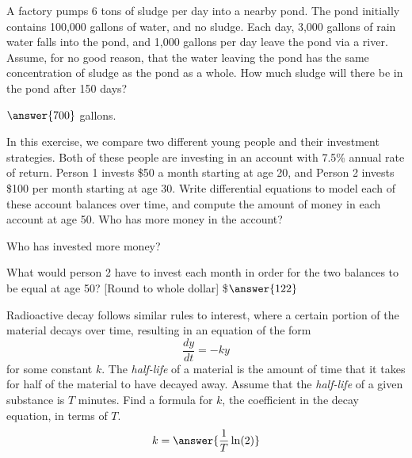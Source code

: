 \documentclass{ximera}
\begin{document}
\begin{exercise}
    A factory pumps 6 tons of sludge per day into a nearby pond. The pond initially contains 100,000 gallons of water, and no sludge. Each day, 3,000 gallons of rain water falls into the pond, and 1,000 gallons per day leave the pond via a river. Assume, for no good reason, that the water leaving the pond has the same concentration of sludge as the pond as a whole. How much sludge will there be in the pond after 150 days? %
    
    $\answer{700}$ gallons.
\end{exercise}

\begin{exercise}
    In this exercise, we compare two different young people and their investment strategies. Both of these people are investing in an account with 7.5\% annual rate of return. Person 1 invests \$50 a month starting at age 20, and Person 2 invests \$100 per month starting at age 30. Write differential equations to model each of these account balances over time, and compute the amount of money in each account at age 50. Who has more money in the account? 
    \begin{multipleChoice}
    \end{multipleChoice}
    \begin{problem}
        Who has invested more money? 
        \begin{multipleChoice}
        \end{multipleChoice}
        \begin{problem}
            What would person 2 have to invest each month in order for the two balances to be equal at age 50? [Round to whole dollar] \$$\answer{122}$
        \end{problem}
    \end{problem}
\end{exercise}

\begin{exercise}
    Radioactive decay follows similar rules to interest, where a certain portion of the material decays over time, resulting in an equation of the form 
    \[ 
        \frac{dy}{dt} = -ky 
    \] 
    for some constant $k$. The \emph{half-life} of a material is the amount of time that it takes for half of the material to have decayed away. Assume that the \emph{half-life} of a given substance is $T$ minutes. Find a formula for $k$, the coefficient in the decay equation, in terms of $T$.
    \[
        k = \answer{\frac{1}{T}\ln(2)}
    \]
\end{exercise}

\end{document}
